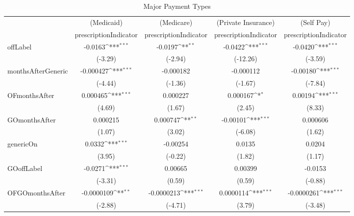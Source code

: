 \begin{table}[htbp]\centering
\def\sym#1{\ifmmode^{#1}\else\(^{#1}\)\fi}
\caption{Major Payment Types\label{tab1}}
\begin{tabular}{l*{4}{c}}
\hline\hline
            &\multicolumn{1}{c}{(Medicaid)}&\multicolumn{1}{c}{(Medicare)}&\multicolumn{1}{c}{(Private Insurance)}&\multicolumn{1}{c}{(Self Pay)}\\
            &\multicolumn{1}{c}{prescriptionIndicator}&\multicolumn{1}{c}{prescriptionIndicator}&\multicolumn{1}{c}{prescriptionIndicator}&\multicolumn{1}{c}{prescriptionIndicator}\\
\hline
offLabel    &     -0.0163\sym{***}&     -0.0197\sym{**} &     -0.0422\sym{***}&     -0.0420\sym{***}\\
            &     (-3.29)         &     (-2.94)         &    (-12.26)         &     (-3.59)         \\
[1em]
monthsAfterGeneric&   -0.000427\sym{***}&   -0.000182         &   -0.000112         &    -0.00180\sym{***}\\
            &     (-4.44)         &     (-1.36)         &     (-1.67)         &     (-7.84)         \\
[1em]
OFmonthsAfter&    0.000465\sym{***}&    0.000227         &    0.000167\sym{*}  &     0.00194\sym{***}\\
            &      (4.69)         &      (1.67)         &      (2.45)         &      (8.33)         \\
[1em]
GOmonthsAfter&    0.000215         &    0.000747\sym{**} &    -0.00101\sym{***}&    0.000606         \\
            &      (1.07)         &      (3.02)         &     (-6.08)         &      (1.62)         \\
[1em]
genericOn   &      0.0332\sym{***}&    -0.00254         &      0.0135         &      0.0204         \\
            &      (3.95)         &     (-0.22)         &      (1.82)         &      (1.17)         \\
[1em]
GOoffLabel  &     -0.0271\sym{***}&     0.00665         &     0.00399         &     -0.0153         \\
            &     (-3.31)         &      (0.59)         &      (0.59)         &     (-0.88)         \\
[1em]
OFGOmonthsAfter&  -0.0000109\sym{**} &  -0.0000213\sym{***}&   0.0000114\sym{***}&  -0.0000261\sym{***}\\
            &     (-2.88)         &     (-4.71)         &      (3.79)         &     (-3.48)         \\

\end{tabular}
\end{table}
